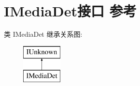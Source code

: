 \hypertarget{interface_i_media_det}{}\section{I\+Media\+Det接口 参考}
\label{interface_i_media_det}
类 I\+Media\+Det 继承关系图\+:\begin{figure}[H]
\begin{center}
\leavevmode
\includegraphics[height=2.000000cm]{interface_i_media_det}
\end{center}
\end{figure}
